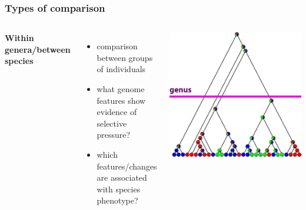 %
\begin{frame}
  \frametitle{Types of comparison}
    \begin{columns}[T] 
        \textcolor{RawSienna}{\textbf{Within genera/between species}}
        \begin{itemize}
	  \item comparison between groups of individuals
	  \item \textcolor{hutton_green}{what genome features show evidence of selective pressure?}
	  \item \textcolor{hutton_blue}{which features/changes are associated with species phenotype?}      
        \end{itemize}
        \includegraphics[width=\textwidth]{images/cladogram_genus}
    \end{columns}  
\end{frame}

